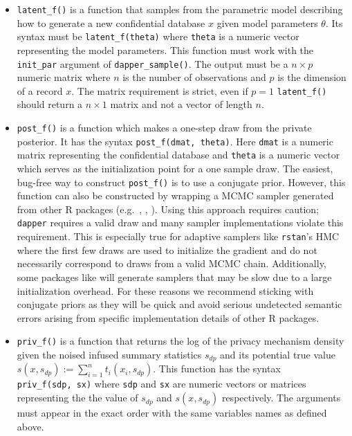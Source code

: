 \begin{itemize}
\item
  \texttt{latent\_f()} is a function that samples from the parametric model
  describing how to generate a new confidential database \(x\) given model parameters \(\theta\).
  Its syntax must be \texttt{latent\_f(theta)} where \texttt{theta} is a numeric vector
  representing the model parameters. This function
  must work with the \texttt{init\_par} argument of \texttt{dapper\_sample()}. The output must be a \(n \times p\) numeric matrix
  where \(n\) is the number of observations and \(p\) is the dimension of a record \(x\).
  The matrix requirement is strict, even if \(p = 1\)
  \texttt{latent\_f()} should return a \(n \times 1\) matrix and not a vector of length \(n\).
\item
  \texttt{post\_f()} is a function which makes a one-step draw from the private posterior. It has
  the syntax \texttt{post\_f(dmat,\ theta)}. Here \texttt{dmat} is a numeric matrix representing the confidential database
  and \texttt{theta} is a numeric vector which serves as the initialization point for a one sample draw.
  The easiest, bug-free way to construct \texttt{post\_f()} is to use a conjugate prior. However,
  this function can also be constructed by wrapping a MCMC sampler generated from other R packages
  (e.g.~, , ). Using this approach requires caution;
  \texttt{dapper} requires a valid draw and many sampler implementations violate
  this requirement. This is especially true for adaptive samplers like \texttt{rstan}'s HMC where
  the first few draws are used to initialize the gradient and do not necessarily correspond to draws from a valid MCMC chain.
  Additionally, some packages like  will generate samplers that may be slow
  due to a large initialization overhead. For these
  reasons we recommend sticking with conjugate priors as they will be quick and avoid
  serious undetected semantic errors arising from specific implementation details of other R packages.
\item
  \texttt{priv\_f()} is a function that returns the log of the privacy mechanism density given
  the noised infused summary statistics \(s_{dp}\) and its potential true value \(s(x, s_{dp}) := \sum_{i=1}^{n} t_i(x_i, s_{dp})\).
  This function has the syntax \texttt{priv\_f(sdp,\ sx)} where \texttt{sdp} and \texttt{sx}
  are numeric vectors or matrices representing the
  the value of \(s_{dp}\) and \(s(x, s_{dp})\) respectively.
  The arguments must appear in the exact order with the same variables names as defined above.

\end{itemize}
